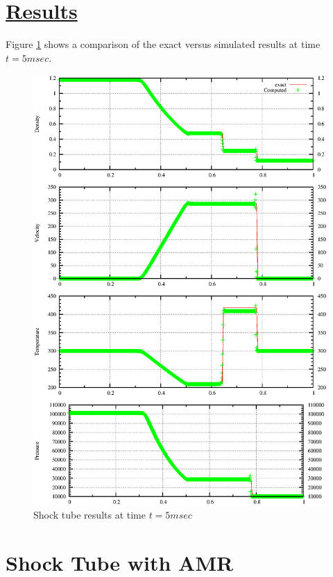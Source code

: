\documentclass[fleqn]{article}
\begin{document}
\section*{\underline{Results}}
Figure \ref{results.ST} shows a comparison of the exact versus simulated results at time $t = 5msec$.
\begin{figure}
\includegraphics[scale=.85]{figures/shockTube.ps}
\caption{Shock tube results at time $t = 5msec$}
\label{results.ST}
\end{figure}
\newpage


\section*{\center Shock Tube with AMR}
 
\end{document}

